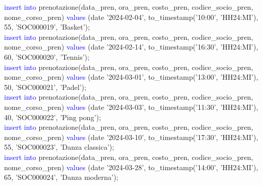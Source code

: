 \documentclass{article}
\begin{document}
\begin{flushleft}
{        \vspace{2mm}
        \hspace*{0.5em}\textcolor{blue}{insert into} prenotazione(data\_pren, ora\_pren, costo\_pren, codice\_socio\_pren, \hspace*{0.5em}nome\_corso\_pren) \textcolor{blue}{values} (date '2024-02-04', to\_timestamp('10:00', 'HH24:MI'), 55, \hspace*{0.5em}'SOC000019', 'Basket'); \\
        \vspace{2mm}
        \hspace*{0.5em}\textcolor{blue}{insert into} prenotazione(data\_pren, ora\_pren, costo\_pren, codice\_socio\_pren, \hspace*{0.5em}nome\_corso\_pren) \textcolor{blue}{values} (date '2024-02-14', to\_timestamp('16:30', 'HH24:MI'), 60, \hspace*{0.5em}'SOC000020', 'Tennis'); \\
        \vspace{2mm}
        \hspace*{0.5em}\textcolor{blue}{insert into} prenotazione(data\_pren, ora\_pren, costo\_pren, codice\_socio\_pren, \hspace*{0.5em}nome\_corso\_pren) \textcolor{blue}{values} (date '2024-03-01', to\_timestamp('13:00', 'HH24:MI'), 50, \hspace*{0.5em}'SOC000021', 'Padel'); \\
        \vspace{2mm}
        \hspace*{0.5em}\textcolor{blue}{insert into} prenotazione(data\_pren, ora\_pren, costo\_pren, codice\_socio\_pren, \hspace*{0.5em}nome\_corso\_pren) \textcolor{blue}{values} (date '2024-03-03', to\_timestamp('11:30', 'HH24:MI'), 40, \hspace*{0.5em}'SOC000022', 'Ping pong'); \\
        \vspace{2mm}
        \hspace*{0.5em}\textcolor{blue}{insert into} prenotazione(data\_pren, ora\_pren, costo\_pren, codice\_socio\_pren, \hspace*{0.5em}nome\_corso\_pren) \textcolor{blue}{values} (date '2024-03-10', to\_timestamp('17:30', 'HH24:MI'), 55, \hspace*{0.5em}'SOC000023', 'Danza classica'); \\
        \vspace{2mm}
        \hspace*{0.5em}\textcolor{blue}{insert into} prenotazione(data\_pren, ora\_pren, costo\_pren, codice\_socio\_pren, \hspace*{0.5em}nome\_corso\_pren) \textcolor{blue}{values} (date '2024-03-28', to\_timestamp('14:00', 'HH24:MI'), 65, \hspace*{0.5em}'SOC000024', 'Danza moderna'); \\
}
\end{flushleft}
\end{document}
